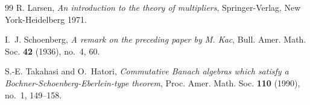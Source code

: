 \documentclass{amsart}
\theoremstyle{definition}
\theoremstyle{remark}
\numberwithin{equation}{section}
\begin{document}
\begin{thebibliography}{99}
 R. Larsen, \emph{An introduction to the theory of multipliers}, Springer-Verlag, New York-Heidelberg 1971.

I.~J. Schoenberg,
\emph{A remark on the preceding paper by M. Kac},
Bull. Amer. Math. Soc. \textbf{42} (1936), no.~4, 60.

S.-E. Takahasi and O.~Hatori,
\emph{Commutative Banach algebras which satisfy a Bochner-Schoenberg-Eberlein-type theorem},
Proc. Amer. Math. Soc. \textbf{110} (1990), no.~1, 149--158.

\end{thebibliography}
\end{document}
